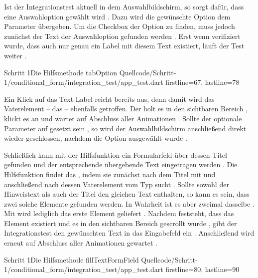 Ist der Integrationstest aktuell in dem Auswahlbildschirm, so sorgt  dafür, dass eine Auswahloption gewählt wird \Lst{\ref{lst:Schritt1HilfsmethodeTabOption}}.
Dazu wird die gewünschte Option dem Parameter  übergeben.
Um die Checkbox der Option zu finden, muss jedoch zunächst der Text der Auswahloption gefunden werden .
Erst wenn verifiziert wurde, dass auch nur genau ein Label mit diesem Text existiert, läuft der Test weiter . 

\begin{alexlisting}{Schritt 1}{Die Hilfsmethode tabOption}
  {Quellcode/Schritt-1/conditional_form/integration_test/app_test.dart}
  {firstline=67, lastline=78}
  \label{lst:Schritt1HilfsmethodeTabOption}
\end{alexlisting}

Ein Klick auf das Text-Label reicht bereits aus, denn damit wird das Vaterelement -- das  -- ebenfalls getroffen.
Der  holt es in den sichtbaren Bereich , klickt es  an und wartet auf Abschluss aller Animationen .
Sollte der optionale Parameter  auf  gesetzt sein , so wird der Auswahlbildschirm anschließend direkt wieder geschlossen, nachdem die Option ausgewählt wurde  . 
  
Schließlich kann mit der Hilfsfunktion  ein Formularfeld über dessen Titel gefunden und der entsprechende übergebende Text eingetragen werden \Lst{\ref{lst:Schritt1HilfsmethodeFillTextFormField}}.
Die Hilfsfunktion findet das , indem sie zunächst nach dem Titel mit  und anschließend nach dessen Vaterelement vom Typ  sucht . Sollte sowohl der Hinweistext als auch der Titel den gleichen Text enthalten, so kann es sein, dass zwei solche Elemente gefunden werden. In Wahrheit ist es aber zweimal dasselbe . Mit  wird lediglich das erste Element geliefert .
Nachdem feststeht, dass das Element existiert  und es in den sichtbaren Bereich gescrollt wurde , gibt der Integrationstest den gewünschten Text in das Eingabefeld ein .
Anschließend wird erneut auf Abschluss aller Animationen gewartet .

\begin{alexlisting}{Schritt 1}{Die Hilfsmethode fillTextFormField}
  {Quellcode/Schritt-1/conditional_form/integration_test/app_test.dart}
  {firstline=80, lastline=90}
  \label{lst:Schritt1HilfsmethodeFillTextFormField}
\end{alexlisting}

